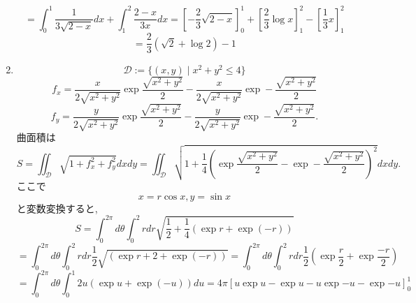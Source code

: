 \documentclass[a4paper,10pt,report]{amsart}
\theoremstyle{plain}
\theoremstyle{definition}
\theoremstyle{remark}
\begin{document}
\begin{enumerate}
\begin{equation*}
        \end{equation*}
        \begin{equation*}
            =\int_{0}^{1}\frac{1}{3\sqrt{2-x}}dx+\int_{1}^{2}\frac{2-x}{3x}dx={\left[-\frac{2}{3}\sqrt{2-x}\right]}_{0}^{1}+{\left[\frac{2}{3}\log{}x\right]}_{1}^{2}-{\left[\frac{1}{3}x\right]}_{1}^{2}
        \end{equation*}
        \begin{equation*}
            =\frac{2}{3}(\sqrt{2}+\log{2})-1
        \end{equation*}
        \item 
        \begin{equation*}
            \mathcal{D}:=\{(x,y)\mid{}x^{2}+y^{2}\leq4\}
        \end{equation*}
        \begin{equation*}
            f_{x}=\frac{x}{2\sqrt{x^{2}+y^{2}}}\exp{\frac{\sqrt{x^{2}+y^{2}}}{2}}-\frac{x}{2\sqrt{x^{2}+y^{2}}}\exp-{\frac{\sqrt{x^{2}+y^{2}}}{2}}
        \end{equation*}
        \begin{equation*}
            f_{y}=\frac{y}{2\sqrt{x^{2}+y^{2}}}\exp{\frac{\sqrt{x^{2}+y^{2}}}{2}}-\frac{y}{2\sqrt{x^{2}+y^{2}}}\exp-{\frac{\sqrt{x^{2}+y^{2}}}{2}}.
        \end{equation*}
        曲面積は
        \begin{equation*}
            S=\iint_{\mathcal{D}}\sqrt{1+f_{x}^{2}+f_{y}^{2}}dxdy=\iint_{\mathcal{D}}\sqrt{1+\frac{1}{4}{\left(\exp{\frac{\sqrt{x^{2}+y^{2}}}{2}}-\exp-{\frac{\sqrt{x^{2}+y^{2}}}{2}}\right)}^{2}}dxdy.
        \end{equation*}
        ここで
        \begin{equation*}
            x=r\cos{x},y=\sin{x}
        \end{equation*}
        と変数変換すると, 
        \begin{equation*}
            S=\int_{0}^{2\pi}d\theta\int_{0}^{2}rdr\sqrt{\frac{1}{2}+\frac{1}{4}\left(\exp{r}+\exp{(-r)}\right)}
        \end{equation*}
        \begin{equation*}
            =\int_{0}^{2\pi}d\theta\int_{0}^{2}rdr\frac{1}{2}\sqrt{\left(\exp{r}+2+\exp{(-r)}\right)}=\int_{0}^{2\pi}d\theta\int_{0}^{2}rdr\frac{1}{2}\left(\exp{\frac{r}{2}}+\exp{\frac{-r}{2}}\right)
        \end{equation*}
        \begin{equation*}
            =\int_{0}^{2\pi}d\theta\int_{0}^{1}2u\left(\exp{u}+\exp{(-u)}\right)du=4\pi {[u\exp{u}-\exp{u}-u\exp{-u}-\exp{-u}]}_{0}^{1}

\end{equation*}
\end{enumerate}
\end{document}
